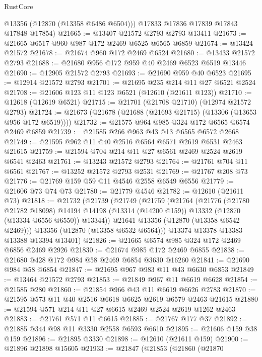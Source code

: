 \begin{lexlean}{RustCore}
\begin{coremodule}
        @13356
        (@12870 (@13358 @6486 @6504)))
      @17833
      @17836
      @17839
      @17843
      @17848
      @17854)
@21665 := @13407 @21572 @2793 @2793 @13411
@21673 := @21665 @6517 @960 @987 @172 @2469 @6525 @6565 @6859
@21674 := @13424 @21572
@21678 := @21674 @960 @172 @2469 @6524
@21680 := @13433 @21572 @2793
@21688 := @21680 @956 @172 @959 @40 @2469 @6523 @6519 @13446
@21690 := @12905 @21572 @2793
@21693 := @21690 @959 @40 @6523
@21695 := @12914 @21572 @2793
@21701 := @21695 @235 @214 @11 @27 @6521 @2524
@21708 := @21606 @123 @11 @123 @6521 (@12610 (@21611 @123))
@21710 := @12618 (@12619 @6521)
@21715 := @21701 (@21708 @21710) (@12974 @21572 @2793)
@21724 := @21673 (@21678 (@21688 (@21693 @21715) (@13306 (@13653 @956 @172 @6519))))
@21732 := @21575 @964 @985 @324 @172 @6565 @6574 @2469 @6859
@21739 := @21585 @266 @963 @43 @13 @6565 @6572 @2668
@21749 := @21595 @962 @11 @40 @2516 @6564 @6571 @2619 @6531 @2463 @21615
@21759 := @21594 @704 @214 @11 @27 @6561 @2469 @2524 @2619 @6541 @2463
@21761 := @13243 @21572 @2793
@21764 := @21761 @704 @11 @6561
@21767 := @13252 @21572 @2793 @2531
@21769 := @21767 @208 @73
@21776 := @21769 @159 @59 @11 @4546 @2558 @6549 @6556
@21779 := @21606 @73 @74 @73
@21780 := @21779 @4546
@21782 := @12610 (@21611 @73)
@21818 := @21732
    (@21739
      (@21749
        (@21759
          (@21764
            (@21776
              (@21780 @21782 @18098)
              @14194
              @14198
              (@13314 (@14200 @159))
              @13332
              (@12870 (@13334 @6556 @6550))
              @13344))
          @21641
          @13356
          (@12870 (@13358 @6542 @2469)))
        @13356
        (@12870 (@13358 @6532 @6564)))
      @13374
      @13378
      @13383
      @13388
      @13394
      @13401)
@21826 := @21665 @6574 @985 @324 @172 @2469 @6856 @2469 @2926
@21830 := @21674 @985 @172 @2469 @6855
@21838 := @21680 @428 @172 @984 @58 @2469 @6854 @3630 @16260
@21841 := @21690 @984 @58 @6854
@21847 := @21695 @967 @983 @11 @43 @6630 @6853
@21849 := @13464 @21572 @2793
@21853 := @21849 @967 @11 @6619 @6628
@21854 := @21585 @280
@21860 := @21854 @966 @43 @11 @6619 @6626 @2783
@21870 := @21595 @573 @11 @40 @2516 @6618 @6625 @2619 @6579 @2463 @21615
@21880 := @21594 @571 @214 @11 @27 @6615 @2469 @2524 @2619 @1262 @2463
@21883 := @21761 @571 @11 @6615
@21885 := @21767 @177 @37
@21892 := @21885 @344 @98 @11 @3330 @2558 @6593 @6610
@21895 := @21606 @159 @38 @159
@21896 := @21895 @3330
@21898 := @12610 (@21611 @159)
@21900 := @21896 @21898 @15605
@21933 := @21847
    (@21853
      (@21860
        (@21870

\end{coremodule}
\end{lexlean}
